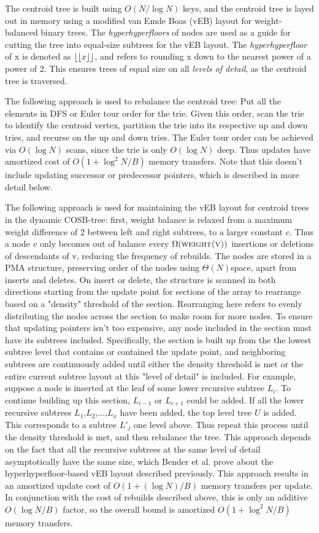 \documentclass{style}
\begin{document}
The centroid tree is built using $O(N/\log{}N)$ keys, and the centroid tree is layed out in memory using a modified van Emde Boas (vEB) layout for weight-balanced binary trees. The \emph{hyperhyperfloors} of nodes are used as a guide for cutting the tree into equal-size subtrees for the vEB layout. The \emph{hyperhyperfloor} of x is denoted as $\lfloor\lfloor{}x\rfloor\rfloor{}$, and refers to rounding x down to the nearest power of a power of 2. This ensures trees of equal size on all \emph{levels of detail}, as the centroid tree is traversed.

The following approach is used to rebalance the centroid tree: Put all the elements in DFS or Euler tour order for the trie. Given this order, scan the trie to identify the centroid vertex, partition the trie into its respective up and down tries, and recurse on the up and down tries. The Euler tour order can be achieved via $O(\log{}N)$ scans, since the trie is only $O(\log{}N)$ deep. Thus updates have amortized cost of $O(1+\log^{2}N/B)$ memory transfers. Note that this doesn't include updating successor or predecessor pointers, which is described in more detail below.

The following approach is used for maintaining the vEB layout for centroid trees in the dynamic COSB-tree: first, weight balance is relaxed from a maximum weight difference of 2 between left and right subtrees, to a larger constant $c$. Thus a node $v$ only becomes out of balance every $\Omega(\textsc{weight(v)})$ insertions or deletions of descendants of v, reducing the frequency of rebuilds. The nodes are stored in a PMA structure, preserving order of the nodes using $\Theta(N)$space, apart from inserts and deletes. On insert or delete, the structure is scanned in both directions starting from the update point for sections of the array to rearrange based on a "density" threshold of the section. Rearranging here refers to evenly distributing the nodes across the section to make room for more nodes. To ensure that updating pointers isn't too expensive, any node included in the section must have its subtrees included. Specifically, the section is built up from the the lowest subtree level that contains or contained the update point, and neighboring subtrees are continuously added until either the density threshold is met or the entire current subtree layout at this "level of detail" is included. For example, suppose a node is inserted at the leaf of some lower recursive subtree $L_{i}$. To continue building up this section, $L_{i-1}$ or $L_{i+1}$ could be added. If all the lower recursive subtrees $L_{1}$,$L_{2}$,...,$L_{x}$ have been added, the top level tree $U$ is added. This corresponds to a subtree $L'_{j}$ one level above. Thus repeat this process until the density threshold is met, and then rebalance the tree. This approach depends on the fact that all the recursive subtrees at the same level of detail asymptotically have the same size, which Bender et al. prove about the hyperhyperfloor-based vEB layout described previously. This approach results in an amortized update cost of $O(1+(\log{}N)/B)$ memory transfers per update. In conjunction with the cost of rebuilds described above, this is only an additive $O(\log{}N/B)$ factor, so the overall bound is amortized $O(1+\log^{2}N/B)$ memory transfers.
\end{document}
